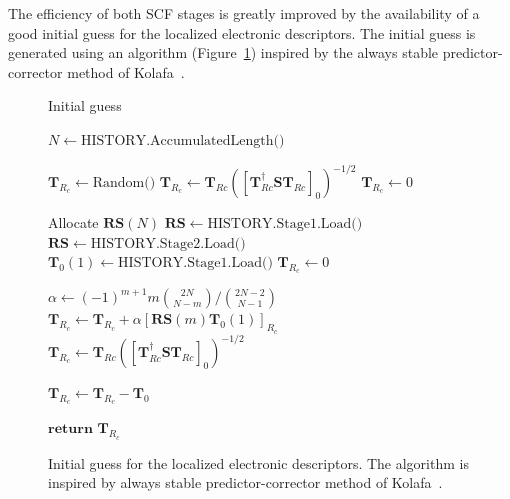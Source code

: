 \documentclass[aip,jcp,reprint,amsmath,amssymb]{revtex4-1}
\begin{document}
The efficiency of both SCF stages is greatly improved by the availability of a good initial guess for the localized electronic descriptors. The initial guess is generated using an algorithm (Figure~\ref{fig:guess}) inspired by the always stable predictor-corrector method of Kolafa~\cite{Kolafa2004}.

\begin{figure}
\begin{algorithm}[H]
  \caption{Initial guess}
  \label{alg:guess}
   \begin{algorithmic}[1]

	\State $N \gets \text{HISTORY.AccumulatedLength()}$ 

	 

			\State $\mathbf{T}_{R_c} \gets \text{Random()}$ %
			\State $\mathbf{T}_{R_c} \gets \mathbf{T}_{Rc} ([\mathbf{T}_{Rc}^{\dagger}\mathbf{S}\mathbf{T}_{Rc}]_0)^{-1/2}$ 
		\Else
			\State $\mathbf{T}_{R_c} \gets 0 $
		\EndIf

	\Else {}
	
		\State Allocate $\mathbf{RS}(N)$ 	
			\State $\mathbf{RS} \gets \text{HISTORY.Stage1.Load()}$ %
		\Else
			\State $\mathbf{RS} \gets \text{HISTORY.Stage2.Load()}$ %
		\EndIf
		\State $\mathbf{T}_{0}(1) \gets \text{HISTORY.Stage1.Load()}$ 
		\State $\mathbf{T}_{R_c} \gets 0$
		
			\State $\alpha \gets (-1)^{m+1} m \binom{2N}{ N-m} / \binom{2N-2}{N-1}$ 
			\State $\mathbf{T}_{R_c} \gets \mathbf{T}_{R_c} + \alpha [\mathbf{RS}(m) \mathbf{T}_{0}(1)]_{R_c} $ 
		\EndFor
		\State $\mathbf{T}_{R_c} \gets \mathbf{T}_{Rc} ([\mathbf{T}_{Rc}^{\dagger}\mathbf{S}\mathbf{T}_{Rc}]_0)^{-1/2}$ 
		
			\State $\mathbf{T}_{R_c} \gets \mathbf{T}_{R_c}  - \mathbf{T}_{0}$
		\EndIf

	\EndIf

	\State $\mathbf{return}$ $\mathbf{T}_{R_c}$
	\EndProcedure
   \end{algorithmic}
\end{algorithm}
\caption{\label{fig:guess} Initial guess for the localized electronic descriptors. The algorithm is inspired by always stable predictor-corrector method of Kolafa~\cite{Kolafa2004}.}
\end{figure}
\end{document}
